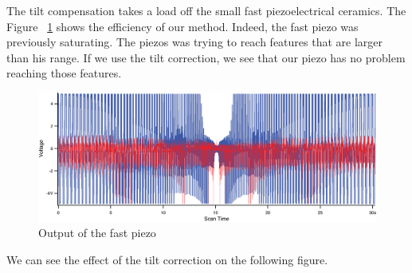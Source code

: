 The tilt compensation takes a load off the small fast piezoelectrical ceramics. The Figure ~\ref{spiralzfast} shows the efficiency of our method. Indeed, the fast piezo was previously saturating. The piezos was trying to reach features that are larger than his range. If we use the tilt correction, we see that our piezo has no problem reaching those features.


\begin{figure}[H]
  \centering
  \includegraphics[scale=0.4]{images/tiltcorrectiongraph.eps}
    \caption{Output of the fast piezo}
  \label{spiralzfast}
\end{figure}

We can see the effect of the tilt correction on the following figure.

